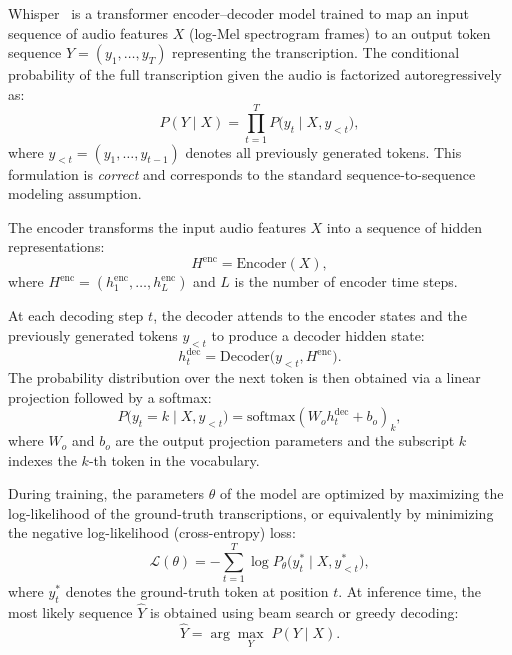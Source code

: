 \documentclass[12pt,oneside]{report}
\begin{document}
Whisper~\cite{radford2023whisper} is a transformer encoder--decoder model trained to map an input sequence of audio features $X$ (log-Mel spectrogram frames) to an output token sequence $Y = (y_1,\dots,y_T)$ representing the transcription. The conditional probability of the full transcription given the audio is factorized autoregressively as:
\begin{equation}
    P(Y \mid X)
    = \prod_{t=1}^{T} P\bigl(y_t \mid X, y_{<t}\bigr),
\end{equation}
where $y_{<t} = (y_1,\dots,y_{t-1})$ denotes all previously generated tokens.  
This formulation is \emph{correct} and corresponds to the standard sequence-to-sequence~\cite{radford2023whisper} modeling assumption.

The encoder transforms the input audio features $X$ into a sequence of hidden representations:
\begin{equation}
    H^{\mathrm{enc}} = \mathrm{Encoder}(X),
\end{equation}
where $H^{\mathrm{enc}} = (h^{\mathrm{enc}}_1,\dots,h^{\mathrm{enc}}_{L})$ and $L$ is the number of encoder time steps.

At each decoding step $t$, the decoder attends to the encoder states and the previously generated tokens $y_{<t}$ to produce a decoder hidden state:
\begin{equation}
    h^{\mathrm{dec}}_t = \mathrm{Decoder}\bigl(y_{<t}, H^{\mathrm{enc}}\bigr).
\end{equation}
The probability distribution over the next token is then obtained via a linear projection followed by a softmax:
\begin{equation}
    P\bigl(y_t = k \mid X, y_{<t}\bigr)
    = \mathrm{softmax}\!\left(W_o h^{\mathrm{dec}}_t + b_o\right)_k,
\end{equation}
where $W_o$ and $b_o$ are the output projection parameters and the subscript $k$ indexes the $k$-th token in the vocabulary.

During training, the parameters $\theta$ of the model are optimized by maximizing the log-likelihood of the ground-truth transcriptions, or equivalently by minimizing the negative log-likelihood (cross-entropy) loss:
\begin{equation}
    \mathcal{L}(\theta)
    = - \sum_{t=1}^{T} \log P_\theta\bigl(y_t^{\ast} \mid X, y_{<t}^{\ast}\bigr),
\end{equation}
where $y_t^{\ast}$ denotes the ground-truth token at position $t$. At inference time, the most likely sequence $\hat{Y}$ is obtained using beam search or greedy decoding:
\begin{equation}
    \hat{Y} = \arg\max_{Y} \; P(Y \mid X).
\end{equation}
\end{document}
